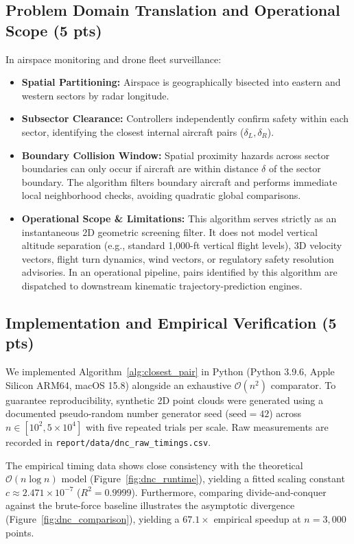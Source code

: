 \subsection{Problem Domain Translation and Operational Scope (5 pts)}
In airspace monitoring and drone fleet surveillance:
\begin{itemize}
    \item \textbf{Spatial Partitioning:} Airspace is geographically bisected into eastern and western sectors by radar longitude.
    \item \textbf{Subsector Clearance:} Controllers independently confirm safety within each sector, identifying the closest internal aircraft pairs ($\delta_L, \delta_R$).
    \item \textbf{Boundary Collision Window:} Spatial proximity hazards across sector boundaries can only occur if aircraft are within distance $\delta$ of the sector boundary. The algorithm filters boundary aircraft and performs immediate local neighborhood checks, avoiding quadratic global comparisons.
    \item \textbf{Operational Scope \& Limitations:} This algorithm serves strictly as an instantaneous 2D geometric screening filter. It does not model vertical altitude separation (e.g., standard 1,000-ft vertical flight levels), 3D velocity vectors, flight turn dynamics, wind vectors, or regulatory safety resolution advisories. In an operational pipeline, pairs identified by this algorithm are dispatched to downstream kinematic trajectory-prediction engines.
\end{itemize}

\subsection{Implementation and Empirical Verification (5 pts)}
We implemented Algorithm~\ref{alg:closest_pair} in Python (Python 3.9.6, Apple Silicon ARM64, macOS 15.8) alongside an exhaustive $\mathcal{O}(n^2)$ comparator. To guarantee reproducibility, synthetic 2D point clouds were generated using a documented pseudo-random number generator seed ($\text{seed} = 42$) across $n \in [10^2, 5 \times 10^4]$ with five repeated trials per scale. Raw measurements are recorded in \texttt{report/data/dnc\_raw\_timings.csv}.

The empirical timing data shows close consistency with the theoretical $\mathcal{O}(n \log n)$ model (Figure~\ref{fig:dnc_runtime}), yielding a fitted scaling constant $c \approx 2.471 \times 10^{-7}$ ($R^2 = 0.9999$). Furthermore, comparing divide-and-conquer against the brute-force baseline illustrates the asymptotic divergence (Figure~\ref{fig:dnc_comparison}), yielding a $67.1\times$ empirical speedup at $n = 3,000$ points.


